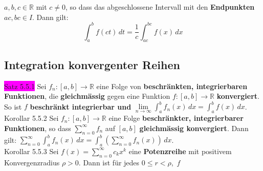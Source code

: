 \documentclass[landscape, 10pt]{article}
\newcommand{\R}{\mathbb{R}}
\begin{document}
\begin{multicols}{3}
{                            $a,b,c\in\R$} mit 
                            \textcolor{NavyBlue}{$c\neq0$}, 
                            so dass das abgeschlossene 
                            Intervall mit den 
                            \textbf{Endpunkten} \\
                            \textcolor{NavyBlue}{$ac,bc\in I$}. 
                            Dann gilt: 
                            \begin{equation*}
                                   \int_a^bf(ct)\,dt
                                   =\frac{1}{c}
                                   \int_{ac}^{bc}f(x)\,dx
                            \end{equation*}
       \subsection{Integration konvergenter Reihen}
              \colorbox{magenta}{Satz 5.5.1} 
                     Sei \textcolor{NavyBlue}{$f_n:[a,b]\longrightarrow\R$} 
                     eine Folge von \textbf{beschränkten, integrierbaren Funktionen}, 
                     die \textbf{gleichmässig} gegen 
                     eine Funktion 
                     \textcolor{NavyBlue}{$f:[a,b]\longrightarrow\R$} 
                     \textbf{konvergiert}.
                     So ist \textcolor{NavyBlue}{$f$} 
                     \textbf{beschränkt integrierbar und} 
                     \textcolor{NavyBlue}{
                     $\lim\limits_{n\to\infty}\int_a^bf_n(x)\,dx =\int_a^bf(x)\,dx$}.\\
              \colorbox{BurntOrange}{Korollar 5.5.2} Sei 
                     \textcolor{NavyBlue}{$f_n:[a,b]\longrightarrow\R$} eine Folge 
                     \textbf{beschränkter, integrierbarer Funktionen}, so dass 
                     \textcolor{NavyBlue}{$\sum_{n=0}^\infty f_n$} auf 
                     \textcolor{NavyBlue}{$[a,b]$}
                     \textbf{gleichmässig konvergiert}. Dann gilt: 
                     \textcolor{NavyBlue}{$\sum_{n=0}^\infty\int_a^bf_n(x)\,dx
                     =\int_a^b(\sum_{n=0}^\infty f_n(x))\,dx$}. \\
              \colorbox{BurntOrange}{Korollar 5.5.3} 
                     Sei \textcolor{NavyBlue}{$f(x)=\sum_{n=0}^\infty c_kx^k$} 
                     eine \textbf{Potenzreihe} mit positivem Konvergenzradius 
                     \textcolor{NavyBlue}{$\rho>0$}. Dann ist für jedes 
                     \textcolor{NavyBlue}{$0\leqslant r<\rho$},\,
                     \textcolor{NavyBlue}{$f$} 

\end{multicols}
\end{document}

